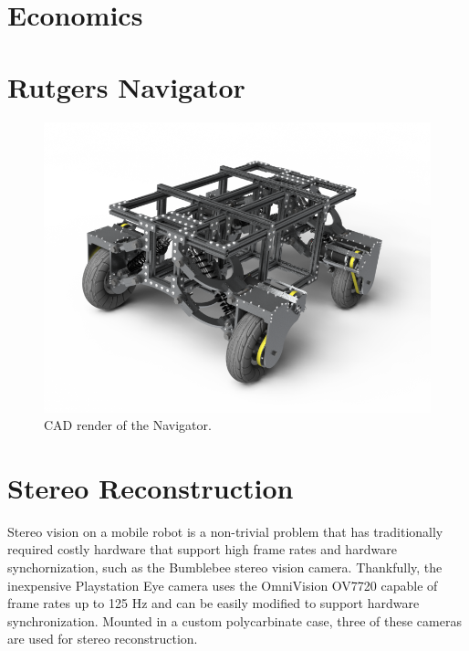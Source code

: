 \documentclass[11pt,twocolumn]{article}
\begin{document}
\section{Economics}
\label{sec:econ}

\section{Rutgers Navigator}
\label{sec:robot}

\begin{figure}
	\centering
	\includegraphics[width=\columnwidth]{figures/navigator-cad}
	\caption{CAD render of the Navigator.}
	\label{fig:robot-cad}
\end{figure}


\section{Stereo Reconstruction}
\label{sec:stereo}
Stereo vision on a mobile robot is a non-trivial problem that has traditionally
required costly hardware that support high frame rates and hardware
synchornization, such as the Bumblebee stereo vision camera. Thankfully, the
inexpensive Playstation Eye camera uses the OmniVision OV7720 capable of frame
rates up to 125 Hz and can be easily modified to support hardware
synchronization. Mounted in a custom polycarbinate case, three of these cameras
are used for stereo reconstruction.
\end{document}
